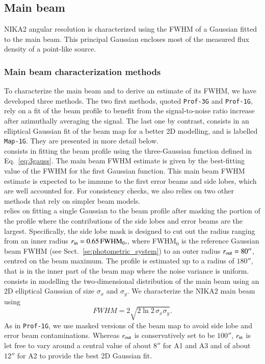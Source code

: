 \documentclass[traditionalabstract]{aa}
\newcommand{\lp}[1]{#1}
\begin{document}
\subsection{Main beam}
\label{se:mainbeam}

NIKA2 angular resolution {\lp is characterized using the FWHM of a
Gaussian fitted to the main beam. This principal Gaussian encloses
most of the measured flux density of a point-like source.} 

\subsubsection{Main beam characterization methods}
\label{se:mainbeam_methods}
To characterize the main beam and to derive an estimate of its FWHM, we
have developed three methods. The two first methods, quoted
{\tt Prof-3G} and {\tt Prof-1G}, rely on a fit of the beam profile to
benefit from the signal-to-noise ratio increase after azimuthally
averaging the signal. The last one by contrast,
consists in an elliptical Gaussian fit of the beam map for a better
2D modelling, and is labelled {\tt Map-1G}. They are presented in more
detail below. \\

 consists in fitting the beam profile using the
three-Gaussian function defined in Eq.~\ref{eq:3gauss}. The main beam
FWHM estimate is given by the best-fitting value of the FWHM for the
first Gaussian function. {\lp This main beam FWHM estimate is expected
  to be immune to the first error beams
and side lobes, which are well accounted for. For consistency checks,
we also relies on two other methods that rely on simpler beam models.}\\

 relies on fitting a single Gaussian to the beam
profile after masking the portion of the profile where the
contributions of the side lobes and error beams are the
largest. Specifically, the side lobe mask is designed to cut out {\lp the
radius ranging from an inner radius
$r_{\rm{in}} = 0.65\, \mathrm{FWHM}_0,$, where FWHM$_0$ is the
reference Gaussian beam FWHM (see Sect.~\ref{se:photometric_system})
to an outer radius $r_{\rm{out}} = 80''$,} centred on the beam
maximum.
The profile is estimated up to a radius of
$180''$, that is in the inner part of the beam map where the noise
variance is uniform.\\

 consists in modelling the two-dimensional distribution of
the main beam using an 2D elliptical Gaussian of size $\sigma_x$ and
$\sigma_y$. We characterize the NIKA2 main beam using
\begin{equation}
  FWHM = 2 \sqrt{2\ln {2}\, \sigma_x\sigma_y}.
  \label{eq:fwhm_geom}
\end{equation}
As in {\tt Prof-1G}, we use masked versions of the
beam map to avoid side lobe and error beam contaminations. 
Whereas $r_{\rm{out}}$ is conservatively set to be $100''$,
$r_{\rm{in}}$ is let free to vary around a central value of about $8''$
for A1 and A3 and of about $12''$ for A2 to provide the best 2D Gaussian
fit.
\end{document}
